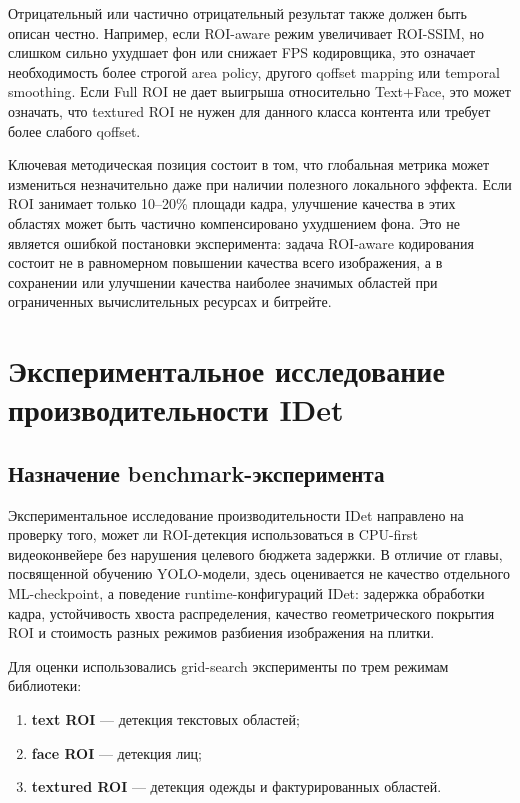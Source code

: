 \documentclass[12pt,a4paper,oneside,openany]{report}
\newcommand{\important}[1]{\textbf{#1}}
\begin{document}
Отрицательный или частично отрицательный результат также должен быть описан честно. Например, если ROI-aware режим увеличивает ROI-SSIM, но слишком сильно ухудшает фон или снижает FPS кодировщика, это означает необходимость более строгой area policy, другого qoffset mapping или temporal smoothing. Если Full ROI не дает выигрыша относительно Text+Face, это может означать, что textured ROI не нужен для данного класса контента или требует более слабого qoffset.

Ключевая методическая позиция состоит в том, что глобальная метрика может измениться незначительно даже при наличии полезного локального эффекта. Если ROI занимает только 10--20\% площади кадра, улучшение качества в этих областях может быть частично компенсировано ухудшением фона. Это не является ошибкой постановки эксперимента: задача ROI-aware кодирования состоит не в равномерном повышении качества всего изображения, а в сохранении или улучшении качества наиболее значимых областей при ограниченных вычислительных ресурсах и битрейте.


\chapter{Экспериментальное исследование производительности IDet}


\section{Назначение benchmark-эксперимента}

Экспериментальное исследование производительности IDet направлено на проверку того, может ли ROI-детекция использоваться в CPU-first видеоконвейере без нарушения целевого бюджета задержки. В отличие от главы, посвященной обучению YOLO-модели, здесь оценивается не качество отдельного ML-checkpoint, а поведение runtime-конфигураций IDet: задержка обработки кадра, устойчивость хвоста распределения, качество геометрического покрытия ROI и стоимость разных режимов разбиения изображения на плитки.

Для оценки использовались grid-search эксперименты по трем режимам библиотеки:
\begin{enumerate}[label=\arabic*)]
\item \important{text ROI} --- детекция текстовых областей;
\item \important{face ROI} --- детекция лиц;
\item \important{textured ROI} --- детекция одежды и фактурированных областей.
\end{enumerate}
\end{document}
